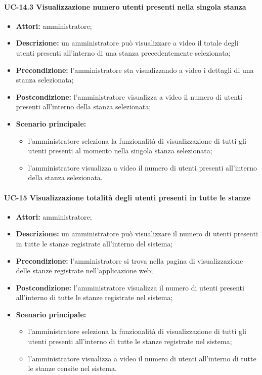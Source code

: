 \paragraph{UC-14.3 Visualizzazione numero utenti presenti nella singola stanza}
\begin{itemize}
    \item \textbf{Attori:} amministratore;
    \item \textbf{Descrizione:} un amministratore pu\`{o} visualizzare a video il totale degli utenti presenti all'interno di una stanza precedentemente selezionata;
    \item \textbf{Precondizione:} l'amministratore sta visualizzando a video i dettagli di una stanza selezionata;
    \item \textbf{Postcondizione:} l'amministratore visualizza a video il numero di utenti presenti all'interno della stanza selezionata;
    \item \textbf{Scenario principale:}
    \begin{itemize}
        \item l'amministratore seleziona la funzionalità di visualizzazione di tutti gli utenti presenti al momento nella singola stanza selezionata;
        \item l'amministratore visualizza a video il numero di utenti presenti all'interno della stanza selezionata.
    \end{itemize}
\end{itemize}


\paragraph{UC-15 Visualizzazione totalità degli utenti presenti in tutte le stanze}
\begin{itemize}
    \item \textbf{Attori:} amministratore;
    \item \textbf{Descrizione:} un amministratore pu\`{o} visualizzare il numero di utenti presenti in tutte le stanze registrate all'interno del sistema;
    \item \textbf{Precondizione:} l'amministratore si trova nella pagina di visualizzazione delle stanze registrate nell'applicazione web;
    \item \textbf{Postcondizione:} l'amministratore visualizza il numero di utenti presenti all'interno di tutte le stanze registrate nel sistema;
    \item \textbf{Scenario principale:}
    \begin{itemize}
        \item l'amministratore seleziona la funzionalità di visualizzazione di tutti gli utenti presenti all'interno di tutte le stanze registrate nel sistema;
        \item l'amministratore visualizza a video il numero di utenti all'interno di tutte le stanze censite nel sistema.
    \end{itemize}
\end{itemize}

